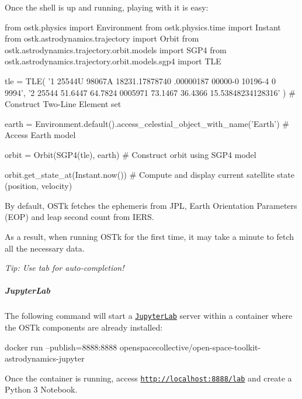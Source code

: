 Once the shell is up and running, playing with it is easy\+:


\begin{DoxyCode}
\textcolor{keyword}{from} ostk.physics \textcolor{keyword}{import} Environment
\textcolor{keyword}{from} ostk.physics.time \textcolor{keyword}{import} Instant
\textcolor{keyword}{from} ostk.astrodynamics.trajectory \textcolor{keyword}{import} Orbit
\textcolor{keyword}{from} ostk.astrodynamics.trajectory.orbit.models \textcolor{keyword}{import} SGP4
\textcolor{keyword}{from} ostk.astrodynamics.trajectory.orbit.models.sgp4 \textcolor{keyword}{import} TLE

tle = TLE(
    \textcolor{stringliteral}{'1 25544U 98067A   18231.17878740  .00000187  00000-0  10196-4 0  9994'},
    \textcolor{stringliteral}{'2 25544  51.6447  64.7824 0005971  73.1467  36.4366 15.53848234128316'}
) \textcolor{comment}{# Construct Two-Line Element set}

earth = Environment.default().access\_celestial\_object\_with\_name(\textcolor{stringliteral}{'Earth'}) \textcolor{comment}{# Access Earth model}

orbit = Orbit(SGP4(tle), earth) \textcolor{comment}{# Construct orbit using SGP4 model}

orbit.get\_state\_at(Instant.now()) \textcolor{comment}{# Compute and display current satellite state (position, velocity)}
\end{DoxyCode}


By default, O\+S\+Tk fetches the ephemeris from J\+PL, Earth Orientation Parameters (E\+OP) and leap second count from I\+E\+RS.

As a result, when running O\+S\+Tk for the first time, it may take a minute to fetch all the necessary data.

{\itshape Tip\+: Use tab for auto-\/completion!}

\subparagraph*{Jupyter\+Lab}

The following command will start a \href{https://jupyterlab.readthedocs.io/en/stable/}{\tt Jupyter\+Lab} server within a container where the O\+S\+Tk components are already installed\+:


\begin{DoxyCode}
docker run --publish=8888:8888 openspacecollective/open-space-toolkit-astrodynamics-jupyter
\end{DoxyCode}


Once the container is running, access \href{http://localhost:8888/lab}{\tt http\+://localhost\+:8888/lab} and create a Python 3 Notebook.

